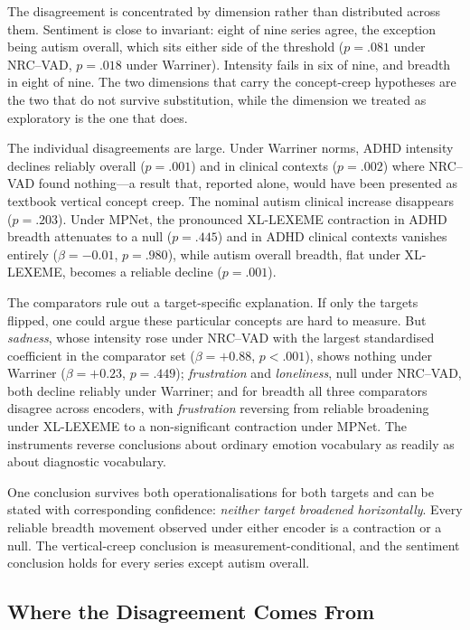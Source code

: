\documentclass[final]{clv2025}
\begin{document}


The disagreement is concentrated by dimension rather than distributed across them.
Sentiment is close to invariant: eight of nine series agree, the exception being autism overall, which
sits either side of the threshold ($p = .081$ under NRC--VAD, $p = .018$ under Warriner).
Intensity fails in six of nine, and breadth in eight of nine. The two dimensions that carry
the concept-creep hypotheses are the two that do not survive substitution, while the
dimension we treated as exploratory is the one that does.

The individual disagreements are large. Under Warriner norms, ADHD intensity declines
reliably overall ($p = .001$) and in clinical contexts ($p = .002$) where NRC--VAD found
nothing---a result that, reported alone, would have been presented as textbook vertical
concept creep. The nominal autism clinical increase disappears ($p = .203$). Under MPNet,
the pronounced XL-LEXEME contraction in ADHD breadth attenuates to a null ($p = .445$) and
in ADHD clinical contexts vanishes entirely ($\beta = -0.01$, $p = .980$), while autism
overall breadth, flat under XL-LEXEME, becomes a reliable decline ($p = .001$).

The comparators rule out a target-specific explanation. If only the targets flipped, one
could argue these particular concepts are hard to measure. But \emph{sadness}, whose intensity rose
under NRC--VAD with the largest standardised coefficient in the comparator set
($\beta = +0.88$, $p<.001$), shows nothing under Warriner ($\beta = +0.23$, $p = .449$);
\emph{frustration} and \emph{loneliness}, null under NRC--VAD, both decline reliably under
Warriner; and for breadth all three comparators disagree across encoders, with
\emph{frustration} reversing from reliable broadening under XL-LEXEME to a non-significant
contraction under MPNet. The instruments reverse conclusions about ordinary emotion
vocabulary as readily as about diagnostic vocabulary.

One conclusion survives both operationalisations for both targets and can be stated with
corresponding confidence: \emph{neither target broadened horizontally}. Every reliable
breadth movement observed under either encoder is a contraction or a null. The
vertical-creep conclusion is measurement-conditional, and the sentiment conclusion holds for
every series except autism overall.

\subsection{Where the Disagreement Comes From}
\label{sec:mechanism}
\end{document}
